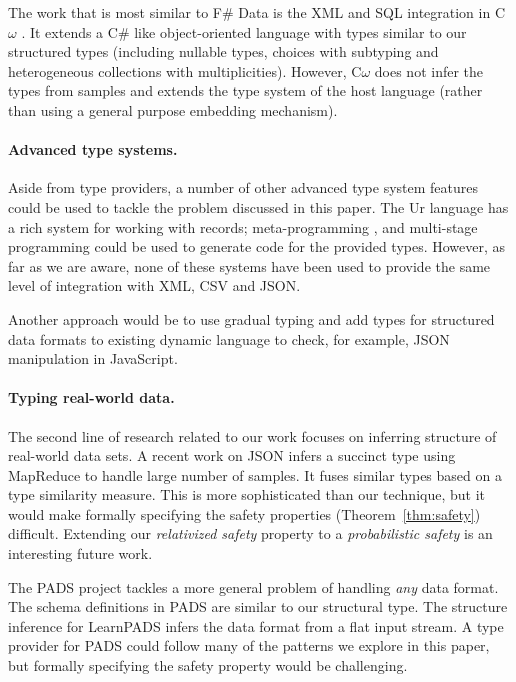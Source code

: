 \documentclass[preprint]{sigplanconf}
\begin{document}
The work that is most similar to F\# Data is the XML and SQL integration in C$\omega$ \cite{comega-xs}.
It extends a C\# like object-oriented language with types similar to our structured types 
(including nullable types, choices with subtyping and heterogeneous collections with multiplicities).
However, C$\omega$ does not infer the types from samples and extends the type system of the host
language (rather than using a general purpose embedding mechanism).

\paragraph{Advanced type systems.}
Aside from type providers, a number of other advanced type system features could be used to
tackle the problem discussed in this paper. The Ur \cite{ur} language has a rich system for working
with records; meta-programming \cite{template-hask}, \cite{th-camlp4} and multi-stage programming \cite{multi-stage}
could be used to generate code for the provided types. However, as far as we are aware, none of these 
systems have been used to provide the same level of integration with XML, CSV and JSON.

Another approach would be to use gradual typing \cite{gradual,gradual-js} and add types for structured
data formats to existing dynamic language to check, for example, JSON manipulation in JavaScript.

\paragraph{Typing real-world data.}
The second line of research related to our work focuses on inferring structure of real-world data sets.
A recent work on JSON \cite{typing-json} infers a succinct type using MapReduce to handle large number
of samples. It fuses similar types based on a type similarity measure. This is more sophisticated than
our technique, but it would make formally specifying the safety properties (Theorem~\ref{thm:safety}) difficult.
Extending our \emph{relativized safety} property to a \emph{probabilistic safety} is an interesting 
future work.

The PADS project \cite{pads-dsl,pads-ml} tackles a more general problem of handling \emph{any} data format.
The schema definitions in PADS are similar to our structural type. The structure inference for LearnPADS
\cite{pads-learn} infers the data format from a flat input stream. A type provider for PADS could follow
many of the patterns we explore in this paper, but formally specifying the safety property would be
challenging.
\end{document}
